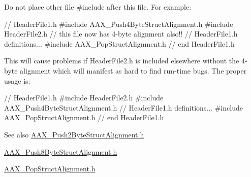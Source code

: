 \begin{DoxyItemize}
\item Do not place other file {\ttfamily \#include} after this file. For example\+: 
\begin{DoxyCode}
\textcolor{comment}{// HeaderFile1.h}
\textcolor{preprocessor}{    #include AAX\_Push4ByteStructAlignment.h}
\textcolor{preprocessor}{    #include HeaderFile2.h  // this file now has 4-byte alignment also!!}
    \textcolor{comment}{// HeaderFile1.h definitions...}
\textcolor{preprocessor}{    #include AAX\_PopStructAlignment.h}
\textcolor{preprocessor}{// end HeaderFile1.h}
\end{DoxyCode}
 This will cause problems if Header\+File2.\+h is included elsewhere without the 4-\/byte alignment which will manifest as hard to find run-\/time bugs. The proper usage is\+: 
\begin{DoxyCode}
\textcolor{comment}{// HeaderFile1.h}
\textcolor{preprocessor}{    #include HeaderFile2.h}
\textcolor{preprocessor}{    #include AAX\_Push4ByteStructAlignment.h}
        \textcolor{comment}{// HeaderFile1.h definitions...}
\textcolor{preprocessor}{    #include AAX\_PopStructAlignment.h}
\textcolor{preprocessor}{// end HeaderFile1.h}
\end{DoxyCode}
\end{DoxyItemize}
\begin{DoxySeeAlso}{See also}
\hyperlink{a00284}{A\+A\+X\+\_\+\+Push2\+Byte\+Struct\+Alignment.\+h} 

\hyperlink{a00286}{A\+A\+X\+\_\+\+Push8\+Byte\+Struct\+Alignment.\+h} 

\hyperlink{a00281}{A\+A\+X\+\_\+\+Pop\+Struct\+Alignment.\+h}
\end{DoxySeeAlso}
